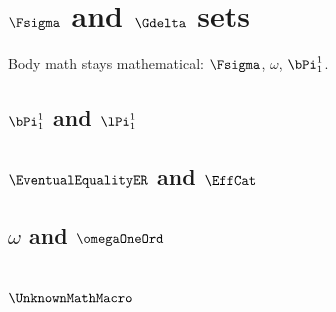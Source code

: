 \section{\texorpdfstring{{\texorpdfstring{\(\Fsigma\)}{Fσ}} and
{\texorpdfstring{\(\Gdelta\)}{Gδ}}
sets}{Fσ and Gδ sets}}\label{sec:bookmark-sets}

Body math stays mathematical: \(\Fsigma\), \(\omega\), \(\bPi^1_1\).

\subsection{\texorpdfstring{{\texorpdfstring{\(\bPi^1_1\)}{Π¹₁}} and
{\texorpdfstring{\(\lPi^{1}_{1}\)}{Π¹₁}}}{Π¹₁ and Π¹₁}}\label{sec:bookmark-hierarchies}

\subsection{\texorpdfstring{{\texorpdfstring{\(\EventualEqualityER\)}{E₀}}
and
{\texorpdfstring{\(\EffCat\)}{Eff}}}{E₀ and Eff}}\label{sec:bookmark-names}

\subsection{\texorpdfstring{{\texorpdfstring{\(\omega\)}{ω}} and
{\texorpdfstring{\(\omegaOneOrd\)}{ω₁}}}{ω and ω₁}}\label{sec:bookmark-ordinals}

\subsection{\texorpdfstring{\(\UnknownMathMacro\)}{\textbackslash UnknownMathMacro}}\label{sec:bookmark-unknown}
